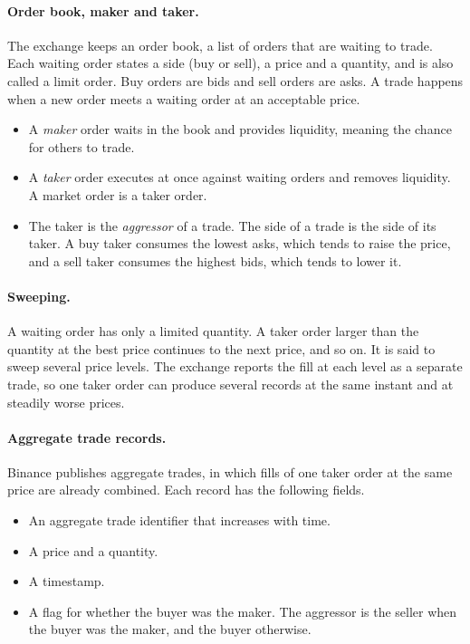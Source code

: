 \documentclass[11pt]{article}
\begin{document}
\paragraph{Order book, maker and taker.}
The exchange keeps an order book, a list of orders that are waiting to trade.
Each waiting order states a side (buy or sell), a price and a quantity, and is also called a limit order.
Buy orders are bids and sell orders are asks.
A trade happens when a new order meets a waiting order at an acceptable price.
\begin{itemize}
  \item A \emph{maker} order waits in the book and provides liquidity, meaning the chance for others to trade.
  \item A \emph{taker} order executes at once against waiting orders and removes liquidity.
  A market order is a taker order.
  \item The taker is the \emph{aggressor} of a trade.
  The side of a trade is the side of its taker.
  A buy taker consumes the lowest asks, which tends to raise the price, and a sell taker consumes the highest bids, which tends to lower it.
\end{itemize}

\paragraph{Sweeping.}
A waiting order has only a limited quantity.
A taker order larger than the quantity at the best price continues to the next price, and so on.
It is said to sweep several price levels.
The exchange reports the fill at each level as a separate trade, so one taker order can produce several records at the same instant and at steadily worse prices.

\paragraph{Aggregate trade records.}
Binance publishes aggregate trades, in which fills of one taker order at the same price are already combined.
Each record has the following fields.
\begin{itemize}
  \item An aggregate trade identifier that increases with time.
  \item A price and a quantity.
  \item A timestamp.
  \item A flag for whether the buyer was the maker.
  The aggressor is the seller when the buyer was the maker, and the buyer otherwise.
\end{itemize}
\end{document}
